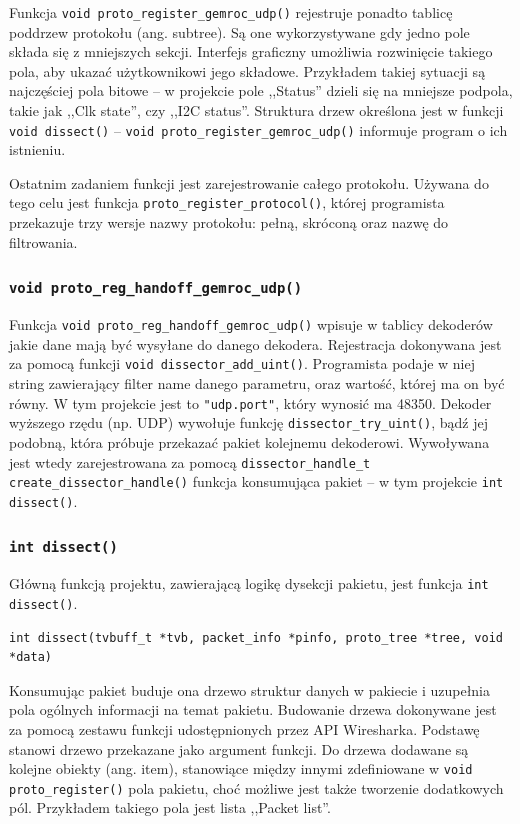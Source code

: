 \documentclass[a4paper, 12pt, twoside, openright]{article}
\begin{document}
Funkcja \texttt{void proto\_register\_gemroc\_udp()} rejestruje ponadto tablicę poddrzew protokołu (ang. subtree). Są one wykorzystywane
gdy jedno pole składa się z mniejszych sekcji. Interfejs graficzny umożliwia rozwinięcie takiego pola, aby ukazać użytkownikowi jego składowe.
Przykładem takiej sytuacji są najczęściej pola bitowe -- w projekcie pole ,,Status'' dzieli się na mniejsze podpola, takie jak
,,Clk state'', czy ,,I2C status''. Struktura drzew określona jest w funkcji \texttt{void dissect()} --
\texttt{void proto\_register\_gemroc\_udp()} informuje program o ich istnieniu.

Ostatnim zadaniem funkcji jest zarejestrowanie całego protokołu. Używana do tego celu jest funkcja \texttt{proto\_register\_protocol()},
której programista przekazuje trzy wersje nazwy protokołu: pełną, skróconą oraz nazwę do filtrowania.

\subsubsection{\texttt{void proto\_reg\_handoff\_gemroc\_udp()}}
\indent\par
Funkcja \texttt{void proto\_reg\_handoff\_gemroc\_udp()} wpisuje w tablicy dekoderów jakie dane mają być wysyłane do danego dekodera.
Rejestracja dokonywana jest za pomocą funkcji \texttt{void dissector\_add\_uint()}. Programista podaje w niej string zawierający filter name
danego parametru, oraz wartość, której ma on być równy. W tym projekcie jest to \texttt{"udp.port"}, który wynosić ma 48350.
Dekoder wyższego rzędu (np. UDP) wywołuje funkcję \texttt{dissector\_try\_uint()}, bądź jej podobną, która próbuje przekazać pakiet
kolejnemu dekoderowi. Wywoływana jest wtedy zarejestrowana za pomocą \texttt{dissector\_handle\_t create\_dissector\_handle()} funkcja
konsumująca pakiet -- w tym projekcie \texttt{int dissect()}.

\subsubsection{\texttt{int dissect()}}
\indent\par
Główną funkcją projektu, zawierającą logikę dysekcji pakietu, jest funkcja \texttt{int dissect()}.
\begin{lstlisting}[style=CStyleLine]
int dissect(tvbuff_t *tvb, packet_info *pinfo, proto_tree *tree, void *data)
\end{lstlisting}
Konsumując pakiet buduje ona drzewo struktur danych w pakiecie i uzupełnia pola ogólnych informacji na temat pakietu. Budowanie
drzewa dokonywane jest za pomocą zestawu funkcji udostępnionych przez API Wiresharka. Podstawę stanowi drzewo przekazane jako
argument funkcji. Do drzewa dodawane są kolejne obiekty (ang. item), stanowiące między innymi zdefiniowane w \texttt{void proto\_register()}
pola pakietu, choć możliwe jest także tworzenie dodatkowych pól. Przykładem takiego pola jest lista ,,Packet list''.
\end{document}
